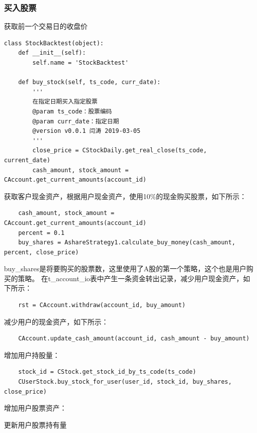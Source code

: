 \documentclass{article}
\begin{document}
\subsubsection{买入股票}
获取前一个交易日的收盘价
\begin{lstlisting}
class StockBacktest(object):
    def __init__(self):
        self.name = 'StockBacktest'

    def buy_stock(self, ts_code, curr_date):
        '''
        在指定日期买入指定股票
        @param ts_code：股票编码
        @param curr_date：指定日期
        @version v0.0.1 闫涛 2019-03-05
        '''
        close_price = CStockDaily.get_real_close(ts_code, current_date)
        cash_amount, stock_amount = CAccount.get_current_amounts(account_id)
\end{lstlisting}
获取客户现金资产，根据用户现金资产，使用10\%的现金购买股票，如下所示：
\begin{lstlisting}
    cash_amount, stock_amount = CAccount.get_current_amounts(account_id)
    percent = 0.1
    buy_shares = AshareStrategy1.calculate_buy_money(cash_amount, percent, close_price)
\end{lstlisting}
buy\_shares是将要购买的股票数，这里使用了A股的第一个策略，这个也是用户购买的策略。\newline
在t\_account\_io表中产生一条资金转出记录，减少用户现金资产，如下所示：
\begin{lstlisting}
    rst = CAccount.withdraw(account_id, buy_amount)
\end{lstlisting}
减少用户的现金资产，如下所示：
\begin{lstlisting}
    CAccount.update_cash_amount(account_id, cash_amount - buy_amount)
\end{lstlisting}
增加用户持股量：
\begin{lstlisting}
    stock_id = CStock.get_stock_id_by_ts_code(ts_code)
    CUserStock.buy_stock_for_user(user_id, stock_id, buy_shares, close_price)
\end{lstlisting}
增加用户股票资产：




更新用户股票持有量
\end{document}
